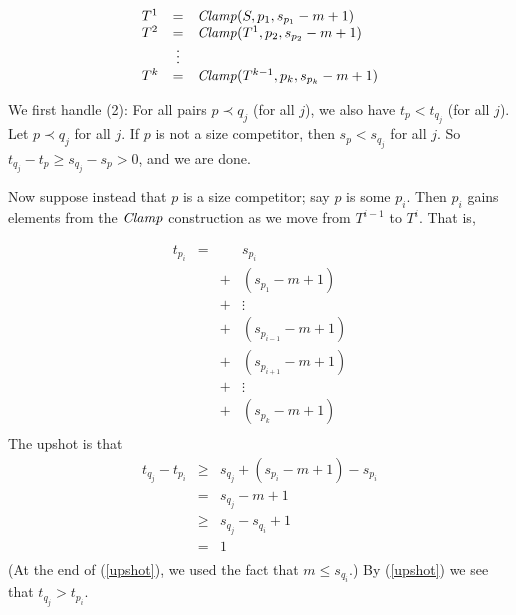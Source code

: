 \documentclass[letterpaper]{article} %
\theoremstyle{definition}
\newcommand{\rem}[1]{\relax}
\newcommand{\Clamp}{\protect{\mbox{\textit{Clamp}}}}
\begin{document}
\[ \begin{array}{lcl}
 T^1  & = &  \Clamp(S,p_1,  s_{p_1} -m + 1)\\

T^2 & = & \Clamp(T^1,p_2,  s_{p_2}-m + 1 )\\
  & \vdots   & \\
T^{k} & = & \Clamp(T^{k-1},p_k, s_{p_k}-m + 1 )\\
\end{array}
\]

We first handle (2):  For all pairs $p \prec q_j$ (for all $j$), we also have $t_p < t_{q_j}$ (for all $j$).  Let $p \prec q_j$ for all $j$.  If $p$ is not a size competitor, then $s_p < s_{q_j}$ for all $j$.  So $t_{q_j} - t_p \ge s_{q_j} - s_p > 0$, and we are done.

Now suppose instead that $p$ is a size competitor; say $p$ is some $p_i$.  Then $p_i$ gains elements from the $\Clamp$ construction as we move from $T^{i-1}$ to $T^i$.  That is,

\begin{equation}
\label{nearendsubset}
\begin{array}{lccc}
t_{p_i} & = & & s_{p_i}\\
& & + & ( s_{p_1}-m  + 1)\\
& & + & \vdots\\
& & + & (s_{p_{i-1}} -m  + 1)\\
& & + & (s_{p_{i+1}} -m  + 1)\\
& & + & \vdots\\
& & + & (s_{p_k}-m + 1)\\
\end{array}
\end{equation}
The upshot is that
\begin{equation}\label{upshot}
\begin{array}{lcl}
t_{q_j} - t_{p_i} & \geq & s_{q_j} + (s_{p_i}-m + 1) - s_{p_i}\\
& = & s_{q_j} - m + 1\\
& \geq & s_{q_j} -s_{q_i} +1\\
& = & 1\\
\end{array}
\end{equation}
(At the end of (\ref{upshot}), we used the fact that $m \leq s_{q_i}$.)
By (\ref{upshot}) we see that $t_{q_j} > t_{p_i}$.

\rem{The reason that the first $\ge$ is not an equals sign $=$ is that it may be the case that $p_i \Subset p_{i^'}$}
\end{document}
